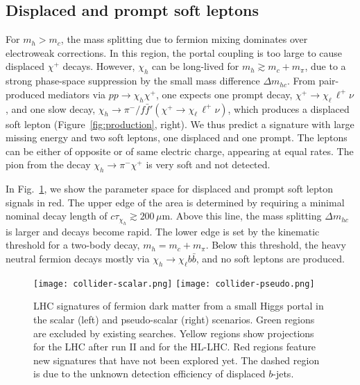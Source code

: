 \documentclass[nofootinbib,prd,aps,superscriptaddress,preprintnumbers]{revtex4}
\begin{document}
\subsection{Displaced and prompt soft leptons}\noindent For $m_h > m_c$, the mass splitting due to fermion mixing dominates over electroweak corrections. In this region, the portal coupling is too large to cause displaced $\chi^+$ decays. However, $\chi_h$ can be long-lived for $m_h \gtrsim m_c + m_\pi$, due to a strong phase-space suppression by the small mass difference $\Delta m_{hc}$. From pair-produced mediators via $pp\to \chi_h\chi^+$, one expects one prompt decay, $\chi^+\to \chi_\ell\,\ell^+\nu$, and one slow decay, $\chi_h\to \pi^-/f\bar{f}' (\chi^+ \to \chi_\ell\,\ell^+\nu)$, which produces a displaced soft lepton (Figure~\ref{fig:production}, right). We thus predict a signature with large missing energy and two soft leptons, one displaced and one prompt. The leptons can be either of opposite or of same electric charge, appearing at equal rates. The pion from the decay $\chi_h\to \pi^-\chi^+$ is very soft and not detected.

In Fig.~\ref{fig:collider-signals}, we show the parameter space for displaced and prompt soft lepton signals in red. The upper edge of the area is determined by requiring a minimal nominal decay length of $c\tau_{\chi_h} \gtrsim 200\,\mu\text{m}$. Above this line, the mass splitting $\Delta m_{hc}$ is larger and decays become rapid. The lower edge is set by the kinematic threshold for a two-body decay, $m_h = m_c + m_\pi$. Below this threshold, the heavy neutral fermion decays mostly via $\chi_h \to \chi_\ell b\bar{b}$, and no soft leptons are produced.

\begin{figure}[!t]
\centering
\texttt{[image: collider-scalar.png]} \hspace*{0cm} \texttt{[image: collider-pseudo.png]}
\caption{\label{fig:collider-signals}LHC signatures of fermion dark matter from a small Higgs portal in the scalar (left) and pseudo-scalar (right) scenarios. Green regions are excluded by existing searches. Yellow regions show projections for the LHC after run II and for the HL-LHC. Red regions feature new signatures that have not been explored yet. The dashed region is due to the unknown detection efficiency of displaced $b$-jets.}
\end{figure}
\end{document}
